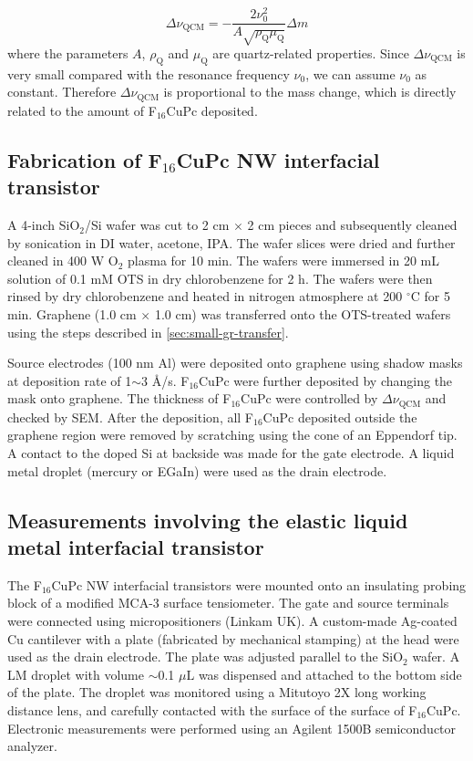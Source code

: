 \begin{equation}
\label{eq:small-1}
\Delta \nu_{\mathrm{QCM}} = -\frac{2 \nu_{0}^{2}}{A \sqrt{\rho_{\mathrm{Q}} \mu_{\mathrm{Q}}}} \Delta m
\end{equation}
where the parameters \(A\), \(\rho_{\mathrm{Q}}\) and \(\mu_{\mathrm{Q}}\)
are quartz-related properties. Since \(\Delta \nu_{\mathrm{QCM}}\) is very
small compared with the resonance frequency \(\nu_{0}\), we can assume
\(\nu_{0}\) as constant. Therefore \(\Delta \nu_{\mathrm{QCM}}\) is
proportional to the mass change, which is directly related to the
amount of F\(_{\text{16}}\)CuPc deposited.

\subsection{Fabrication of F\(_{\text{16}}\)CuPc NW interfacial transistor}
\label{sec:small-orgdb060bd}

A 4-inch SiO\(_{\text{2}}\)/Si wafer was cut to 2 cm \(\times\) 2 cm pieces and subsequently
cleaned by sonication in DI water, acetone, IPA. The wafer slices were dried
and further cleaned in 400 W O\(_{\text{2}}\) plasma for 10 min. The wafers were
immersed in 20 mL solution of 0.1 mM OTS in dry chlorobenzene for 2
h. The wafers were then rinsed by dry chlorobenzene and heated in
nitrogen atmosphere at 200 \(^{\circ}\mathrm{C}\) for 5 min. Graphene
(1.0 cm \(\times\) 1.0 cm) was transferred onto the OTS-treated wafers
using the steps described in \autoref{sec:small-gr-transfer}.

Source electrodes (100 nm Al) were deposited onto graphene using
shadow masks at deposition rate of 1\(\sim\)3 \AA{}/s. F\(_{\text{16}}\)CuPc were further
deposited by changing the mask onto graphene. The thickness of
F\(_{\text{16}}\)CuPc were controlled by \(\Delta \nu_{\mathrm{QCM}}\) and checked by
SEM. After the deposition, all F\(_{\text{16}}\)CuPc deposited outside the
graphene region were removed by scratching using the cone of an
Eppendorf tip. A contact to the doped Si at backside was made for the
gate electrode. A liquid metal droplet (mercury or EGaIn) were used as
the drain electrode.

\subsection{Measurements involving the elastic liquid metal interfacial transistor}
\label{sec:small-orgec772cc}

The F\(_{\text{16}}\)CuPc NW interfacial transistors were mounted onto an
insulating probing block of a modified MCA-3 surface tensiometer. The
gate and source terminals were connected using micropositioners
(Linkam UK). A custom-made Ag-coated Cu cantilever with a plate
(fabricated by mechanical stamping) at the head were used as the drain
electrode. The plate was adjusted parallel to the SiO\(_{\text{2}}\) wafer. A LM
droplet with volume \(\sim\)0.1 \(\mu \mathrm{L}\) was dispensed and
attached to the bottom side of the plate. The droplet was monitored
using a Mitutoyo 2X long working distance lens, and carefully
contacted with the surface of the surface of F\(_{\text{16}}\)CuPc. Electronic
measurements were performed using an Agilent 1500B semiconductor
analyzer.

